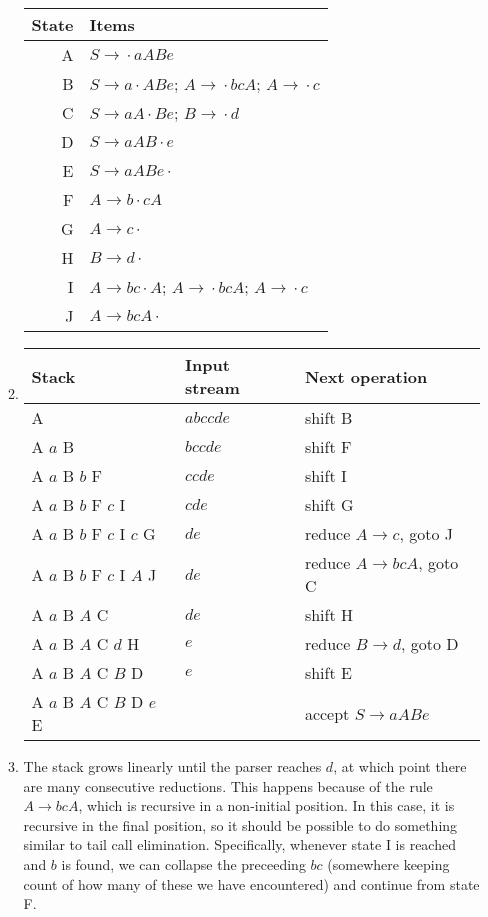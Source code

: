 \documentclass{article}
\begin{document}
\begin{enumerate}
\begin{enumerate}
        \begin{tabular}{r | l}
          State & Items \\
          \hline
          A & $S \to {} \cdot aABe$ \\
          B & $S \to a \cdot ABe$; $A \to {} \cdot bcA$; $A \to {} \cdot c$ \\
          C & $S \to aA \cdot Be$; $B \to {} \cdot d$ \\
          D & $S \to aAB \cdot e$ \\
          E & $S \to aABe \cdot {}$ \\
          F & $A \to b \cdot cA$ \\
          G & $A \to c \cdot {}$ \\
          H & $B \to d \cdot {}$ \\
          I & $A \to bc \cdot A$; $A \to {} \cdot bcA$; $A \to {} \cdot c$ \\
          J & $A \to bcA \cdot {}$ \\
        \end{tabular}
      \item
        \begin{tabular}[t]{l | l | l}
          Stack & Input stream & Next operation \\
          \hline
          A & $abccde$ & shift B \\
          A $a$ B & $bccde$ & shift F \\
          A $a$ B $b$ F & $ccde$ & shift I \\
          A $a$ B $b$ F $c$ I & $cde$ & shift G \\
          A $a$ B $b$ F $c$ I $c$ G & $de$ & reduce $A \to c$, goto J \\
          A $a$ B $b$ F $c$ I $A$ J & $de$ & reduce $A \to bcA$, goto C \\
          A $a$ B $A$ C & $de$ & shift H \\
          A $a$ B $A$ C $d$ H & $e$ & reduce $B \to d$, goto D \\
          A $a$ B $A$ C $B$ D & $e$ & shift E \\
          A $a$ B $A$ C $B$ D $e$ E & & accept $S \to aABe$ \\
        \end{tabular}
      \item The stack grows linearly until the parser reaches $d$, at which point there are many consecutive reductions. This happens because of the rule $A \to bcA$, which is recursive in a non-initial position. In this case, it is recursive in the final position, so it should be possible to do something similar to tail call elimination. Specifically, whenever state I is reached and $b$ is found, we can collapse the preceeding $bc$ (somewhere keeping count of how many of these we have encountered) and continue from state F.

\end{enumerate}
\end{enumerate}
\end{document}
